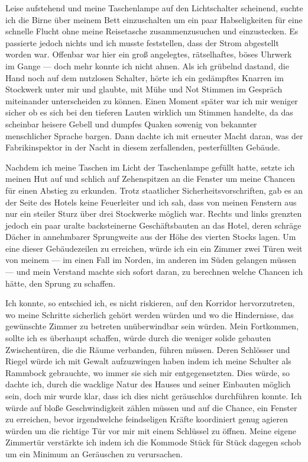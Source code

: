 Leise aufstehend und meine Taschenlampe auf den Lichtschalter scheinend, suchte ich die Birne über meinem Bett einzuschalten um ein paar Habseligkeiten für eine schnelle Flucht ohne meine Reisetasche zusammenzusuchen und einzustecken. Es passierte jedoch nichts und ich musste feststellen, dass der Strom abgestellt worden war. Offenbar war hier ein groß angelegtes, rätselhaftes, böses Uhrwerk im Gange --- doch mehr konnte ich nicht ahnen. Als ich grübelnd dastand, die Hand noch auf dem nutzlosen Schalter, hörte ich ein gedämpftes Knarren im Stockwerk unter mir und glaubte, mit Mühe und Not Stimmen im Gespräch miteinander unterscheiden zu können. Einen Moment später war ich mir weniger sicher ob es sich bei den tieferen Lauten wirklich um Stimmen handelte, da das scheinbar heisere Gebell und dumpfes Quaken sowenig von bekannter menschlicher Sprache bargen. Dann dachte ich mit erneuter Macht daran, was der Fabrikinspektor in der Nacht in diesem zerfallenden, pesterfüllten Gebäude.

Nachdem ich meine Taschen im Licht der Taschenlampe gefüllt hatte, setzte ich meinen Hut auf und schlich auf Zehenspitzen an die Fenster um meine Chancen für einen Abstieg zu erkunden. Trotz staatlicher Sicherheitsvorschriften, gab es an der Seite des Hotels keine Feuerleiter und ich sah, dass von meinen Fenstern aus nur ein steiler Sturz über drei Stockwerke möglich war. Rechts und links grenzten jedoch ein paar uralte backsteinerne Geschäftsbauten an das Hotel, deren schräge Dächer in annehmbarer Sprungweite aus der Höhe des vierten Stocks lagen. Um eine dieser Gebäudezeilen zu erreichen, würde ich ein ein Zimmer zwei Türen weit von meinem --- im einen Fall im Norden, im anderen im Süden gelangen müssen --- und mein Verstand machte sich sofort daran, zu berechnen welche Chancen ich hätte, den Sprung zu schaffen.

Ich konnte, so entschied ich, es nicht riskieren, auf den Korridor hervorzutreten, wo meine Schritte sicherlich gehört werden würden und wo die Hindernisse, das gewünschte Zimmer zu betreten unüberwindbar sein würden. Mein Fortkommen, sollte ich es überhaupt schaffen, würde durch die weniger solide gebauten Zwischentüren, die die Räume verbanden, führen müssen. Deren Schlösser und Riegel würde ich mit Gewalt aufzuzwingen haben indem ich meine Schulter als Rammbock gebrauchte, wo immer sie sich mir entgegensetzten. Dies würde, so dachte ich, durch die wacklige Natur des Hauses und seiner Einbauten möglich sein, doch mir wurde klar, dass ich dies nicht geräuschlos durchführen konnte. Ich würde auf bloße Geschwindigkeit zählen müssen und auf die Chance, ein Fenster zu erreichen, bevor irgendwelche feindseligen Kräfte koordiniert genug agieren würden um die richtige Tür vor mir mit einem Schlüssel zu öffnen. Meine eigene Zimmertür verstärkte ich indem ich die Kommode Stück für Stück dagegen schob um ein Minimum an Geräuschen zu verursachen.

